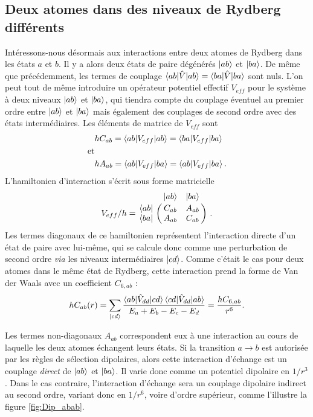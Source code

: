 \subsection{Deux atomes dans des niveaux de Rydberg différents}
\label{subsec:interaction_diff_levels}
Intéressons-nous désormais aux interactions entre deux atomes de Rydberg dans les états $a$ et $b$.
Il y a alors deux états de paire dégénérés $\ket{ab}$ et $\ket{ba}$.
De même que précédemment, les termes de couplage $\braket{ab|\hat{V}|ab}=\braket{ba|\hat{V}|ba}$ sont nuls.
L'on peut tout de même introduire un opérateur potentiel effectif $V_{eff}$ pour le système à deux niveaux $\ket{ab}$ et $\ket{ba}$, qui tiendra compte du couplage éventuel au premier ordre entre $\ket{ab}$ et $\ket{ba}$ mais également des couplages de second ordre avec des états intermédiaires.
Les éléments de matrice de $V_{eff}$ sont
%
\begin{equation}\label{eq:Cab_Aab}
\begin{aligned}
&hC_{ab}=\braket{ab|V_{eff}|ab}=\braket{ba|V_{eff}|ba} \\
\text{et} &\\
&hA_{ab}=\braket{ab|V_{eff}|ba}=\braket{ab|V_{eff}|ba}.
\end{aligned}
\end{equation}
%
L'hamiltonien d'interaction s'écrit sous forme matricielle
\begin{equation}\label{eq:MatrixCab_Aab}
V_{eff}/h = \bordermatrix{~ 	&\ket{ab} 	& \ket{ba} \cr
	\bra{ab}		&C_{ab} 		&A_{ab}	\cr 
	\bra{ba} 		&A_{ab} 		&C_{ab} \cr} \ .
\end{equation}
%
Les termes diagonaux de ce hamiltonien représentent l'interaction directe d'un état de paire avec lui-même, qui se calcule donc comme une perturbation de second ordre \textit{via} les niveaux intermédiaires $\ket{cd}$.
Comme c'était le cas pour deux atomes dans le même état de Rydberg, cette interaction prend la forme de Van der Waals avec un coefficient $C_{6,ab}$ :
\begin{equation}\label{eq:VdW_abab}
hC_{ab}(r)=\sum_{\ket{cd}}{\frac{\braket{ab|\hat{V}_{dd}|cd}\braket{cd|\hat{V}_{dd}|ab}}{E_a + E_b - E_c - E_d}}  = \frac{hC_{6,ab}}{r^6}.
\end{equation}

Les termes non-diagonaux $A_{ab}$ correspondent eux à une interaction au cours de laquelle les deux atomes échangent leurs états.
Si la transition $a\rightarrow b$ est autorisée par les règles de sélection dipolaires, alors cette interaction d'échange est un couplage \textit{direct} de $\ket{ab}$ et $\ket{ba}$.
Il varie donc comme un potentiel dipolaire en $1/r^3$.
Dans le cas contraire, l'interaction d'échange sera un couplage dipolaire indirect au second ordre, variant donc en $1/r^6$, voire d'ordre supérieur, comme l'illustre la figure \eqref{fig:Dip_abab}.

